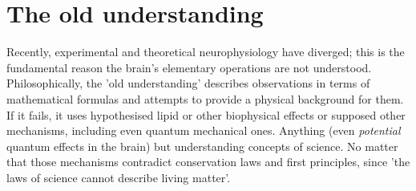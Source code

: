 \section*{The old understanding\label{State-OldUnderstanding}}

Recently, experimental and theoretical neurophysiology have diverged; this is the fundamental reason the brain’s elementary operations are not understood. Philosophically, the 'old understanding' describes observations in terms of mathematical formulas and attempts to provide a physical background for them. If it fails, it uses hypothesised lipid or other biophysical effects or supposed other mechanisms, including even
quantum mechanical ones. Anything (even \textit{potential} quantum effects in the brain) but understanding concepts of science. No matter that those mechanisms contradict
conservation laws and first principles, since 'the 
laws of science cannot describe living matter'.


